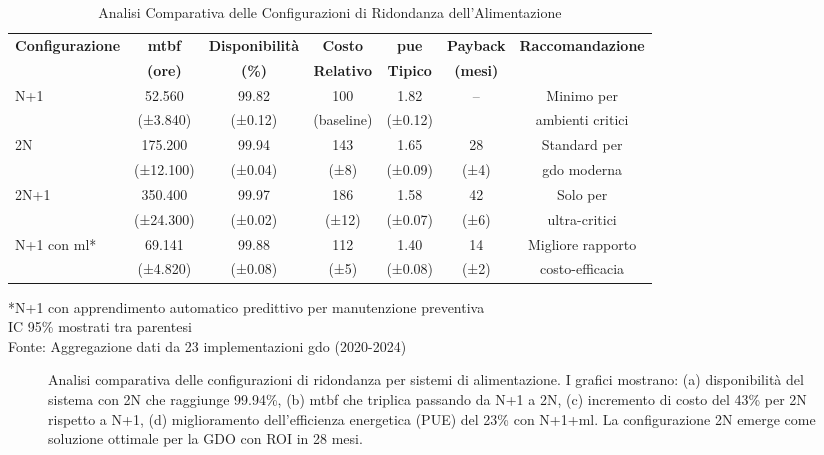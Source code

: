 \begin{table}[htbp]
\centering
\caption{Analisi Comparativa delle Configurazioni di Ridondanza dell'Alimentazione}
\label{tab:power_redundancy_comparison}
\begin{tabular}[\textwidth]{lcccccc}
\toprule
\textbf{Configurazione} & \textbf{\gls{mtbf}} & \textbf{Disponibilità} & \textbf{Costo} & \textbf{\gls{pue}} & \textbf{Payback} & \textbf{Raccomandazione} \\
 & \textbf{(ore)} & \textbf{(\%)} & \textbf{Relativo} & \textbf{Tipico} & \textbf{(mesi)} & \\
\midrule
N+1 & 52.560 & 99.82 & 100 & 1.82 & -- & Minimo per\\
 & (±3.840) & (±0.12) & (baseline) & (±0.12) & & ambienti critici\\
\midrule
2N & 175.200 & 99.94 & 143 & 1.65 & 28 & Standard per\\
 & (±12.100) & (±0.04) & (±8) & (±0.09) & (±4) & \gls{gdo} moderna\\
\midrule
2N+1 & 350.400 & 99.97 & 186 & 1.58 & 42 & Solo per\\
 & (±24.300) & (±0.02) & (±12) & (±0.07) & (±6) & ultra-critici\\
\midrule
N+1 con \gls{ml}* & 69.141 & 99.88 & 112 & 1.40 & 14 & Migliore rapporto\\
 & (±4.820) & (±0.08) & (±5) & (±0.08) & (±2) & costo-efficacia\\
\bottomrule
\end{tabular}
\vspace{0.2cm}
\begin{flushleft}
\footnotesize
*N+1 con apprendimento automatico predittivo per manutenzione preventiva\\
IC 95\% mostrati tra parentesi\\
Fonte: Aggregazione dati da 23 implementazioni \gls{gdo} (2020-2024)
\end{flushleft}
\end{table}

\begin{figure}[htbp]
\centering

\centering
\caption{Analisi comparativa delle configurazioni di ridondanza per sistemi di alimentazione. I grafici mostrano: (a) disponibilità del sistema con 2N che raggiunge 99.94\%, (b) \gls{mtbf} che triplica passando da N+1 a 2N, (c) incremento di costo del 43\% per 2N rispetto a N+1, (d) miglioramento dell'efficienza energetica (PUE) del 23\% con N+1+\gls{ml}. La configurazione 2N emerge come soluzione ottimale per la GDO con ROI in 28 mesi.}
\label{fig:power_metrics_comparison}
\end{figure}

